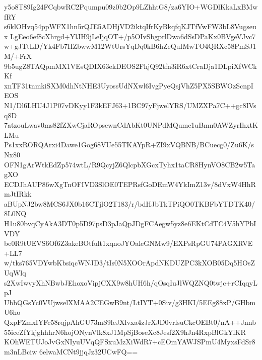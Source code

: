 y5o8T89Ig24FCqbwRC2Pqumpu09z0b2Op9LZhhtG8/za6YIO+WGDlKkaLxBMwfRY
s6klOHvq54ppWFX1hn5rQJE5ADHjVD2iktqIfrKyBkqfqKJTfVwFW3bL8Vugseux
LgEeo6ef8cXhrgd+YlJH9jLeIjqOT+/p5OIvSbgprlDwa6dSsDPaKx0BVgeVJvc7
w+gJTtLD/Yk4Fb7HZbwwM12WtUrsYqDq0kB6hZeQuIMwTO4QRXc58PmSJ1M/+FrX
9b5ugZ8TAQpmMX1VEsQDIX63ekDEOS2FhjQ92tfn3iR6xtCraDja1DLpiXfWCkKf
xnTF31tnmkiSXM0dhNtNHE3UyossUdNXwl6IvgPyeQsjVhZ5PX5SBWOzScnpIEOS
N1/Dl6LHU4J1P07vDKyy1F3kEFJ63+1BC97yFjwelYRS/UMZXPa7C++gc8IVsq8D
7atzouLwav0ms82fZXwCjaROpsewnCdAbKt0UNPdMQumc1uBmn0AWZyrIhxtKLMu
Ps1xxRORQArxi4Dawe1Gog68VUe55TKAYpR+ZI9xVQBNB/BCuecg0/Zu6K/sNx80
OFN1gArWtkEdZp574wtL/R9QcyjZ6QlcpbXGcxTyhx1taCR8HynVO8CB2w5TagXO
ECDJhAUP86wXgTnOFIVD3SlOE0TEPRsfGoDEmW4YkImZ13v/8dVxW4HhRmJtIRkk
aBUpNJ2bw8MCS6JX0b16CTjlO2T183/r/bdHJbTkTPiQO0TKBFbYTDTK40/8L0NQ
H1u80bvqCyAkA3DT0p5D97psD3pJaQpJDgFCAegw5yz8e6EKtCdTC4V5hYPbIVDY
be0R9tUEVS6Of6Z3akeBOtfult1xqnoJYOaleGNMw9/EXPsRpGU74PAGXRVE+LL7
w/tks765VDYwbKbsiqcWNJD3/tIs0N5XOOrApdNKDUZPC3kXOB05Dq5HOsZUqWlq
s2XwIwvyXhNBwbJEhoxoVipjCXX9w8hUH6h/qOsqIuJlWQZNQ0twjc+rCIqqyLpJ
UbbQGsYc0VUjwselXMAA2CEGwB9nt/LtIYT+0Siv/g3HKI/5EEg88xP/GHbmU6ho
QxpFZmxIYFc58rqjpAhGU73mS9leJXlvxa4zJrXJD0vrlsuCkcOEBt0/nA++Jnnb
55iceZfYkjghhhrN6hojONynVlk8xJ1MpSjBoseXc8Jesf2X9hJn4RxpBlGkYlKR
KOhWETUJoJvGxNIyuUVqQFSxuMzXiWdR7+cEOmYAWJSPmU4MyxsFdSr8m3nLBciw
6elwaMCNt9jjqJz32UCwFQ==
